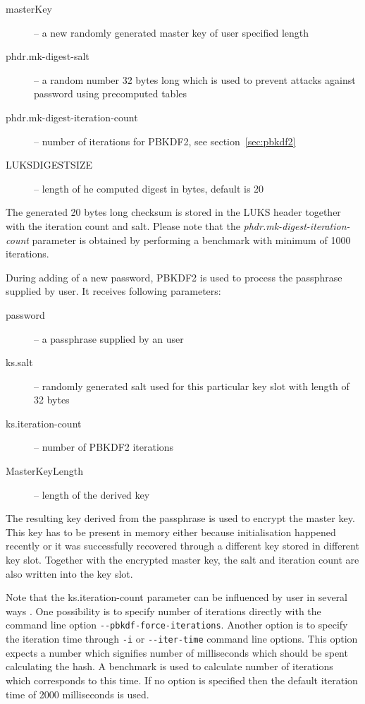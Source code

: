 \documentclass[nolof]{fithesis3}
\begin{document}
\begin{description}
\item[masterKey] -- a new randomly generated master key of user specified length

\item[phdr.mk-digest-salt] -- a random number 32 bytes long which is used to prevent attacks against password using precomputed tables \parencite[see][section 5.6.3]{itmc14}

\item[phdr.mk-digest-iteration-count] -- number of iterations for PBKDF2, see section~\ref{sec:pbkdf2}

\item[LUKS\-DIGEST\-SIZE] -- length of he computed digest in bytes, default is 20
\end{description}

The generated 20 bytes long checksum is stored in the LUKS header together with the iteration count and salt. Please note that the \emph{phdr.mk-digest-iteration-count} parameter is obtained by performing a benchmark with minimum of 1000 iterations.

During adding of a new password, PBKDF2 is used to process the passphrase supplied by user. It receives following parameters:

\begin{description}
\item[password] -- a passphrase supplied by an user

\item[ks.salt] -- randomly generated salt used for this particular key slot with length of 32 bytes

\item[ks.iteration-count] -- number of PBKDF2 iterations

\item[MasterKeyLength] -- length of the derived key
\end{description}

The resulting key derived from the passphrase is used to encrypt the master key. This key has to be present in memory either because initialisation happened recently or it was successfully recovered through a different key stored in different key slot. Together with the encrypted master key, the salt and iteration count are also written into the key slot.

Note that the ks.iteration-count parameter can be influenced by user in several ways \parencite{cryptsetupmanual}. One possibility is to specify number of iterations directly with the command line option \verb+--pbkdf-force-iterations+. Another option is to specify the iteration time through \verb+-i+ or \verb+--iter-time+ command line options. This option expects a number which signifies number of milliseconds which should be spent calculating the hash. A benchmark is used to calculate number of iterations which corresponds to this time. If no option is specified then the default iteration time of 2000 milliseconds is used.
\end{document}
